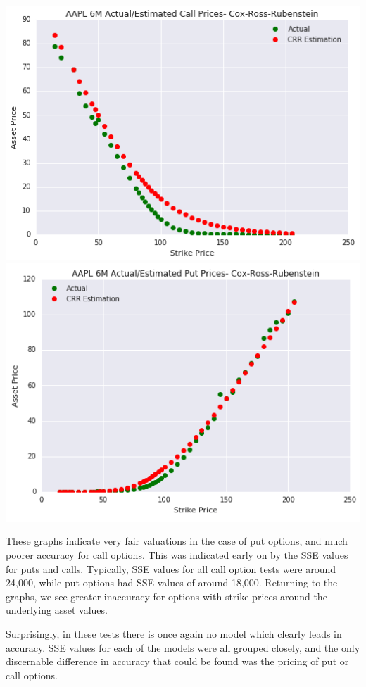 \begin{center}
\includegraphics[scale=0.66, keepaspectratio=true]{Chapter3/AAPL6MCall.png}
\includegraphics[scale=0.66, keepaspectratio=true]{Chapter3/AAPL6MPut.png}
\end{center}

These graphs indicate very fair valuations in the case of put options, and much poorer accuracy for call options. This was indicated early on by the SSE values for puts and calls. Typically, SSE values for all call option tests were around 24,000, while put options had SSE values of around 18,000. Returning to the graphs, we see greater inaccuracy for options with strike prices around the underlying asset values. 

Surprisingly, in these tests there is once again no model which clearly leads in accuracy. SSE values for each of the models were all grouped closely, and the only discernable difference in accuracy that could be found was the pricing of put or call options.

